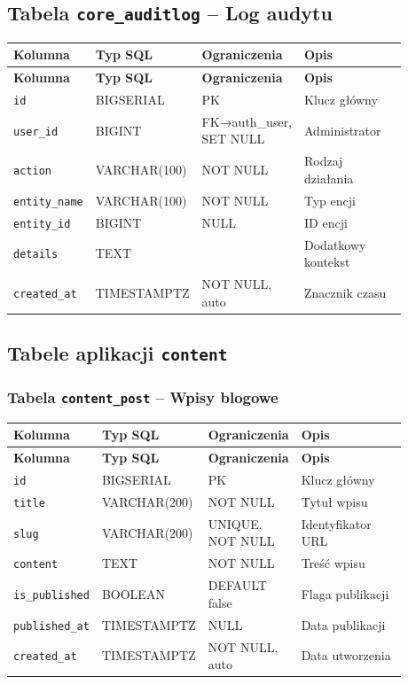\documentclass[12pt,a4paper]{article}
\begin{document}
\subsection{Tabela \texttt{core\_auditlog} -- Log audytu}

\begin{longtable}{p{0.2\linewidth}p{0.18\linewidth}p{0.18\linewidth}p{0.32\linewidth}}
\toprule
\textbf{Kolumna} & \textbf{Typ SQL} & \textbf{Ograniczenia} & \textbf{Opis} \\
\midrule
\endfirsthead
\toprule
\textbf{Kolumna} & \textbf{Typ SQL} & \textbf{Ograniczenia} & \textbf{Opis} \\
\midrule
\endhead
\texttt{id} & BIGSERIAL & PK & Klucz główny \\
\texttt{user\_id} & BIGINT & FK→auth\_user, SET NULL & Administrator \\
\texttt{action} & VARCHAR(100) & NOT NULL & Rodzaj działania \\
\texttt{entity\_name} & VARCHAR(100) & NOT NULL & Typ encji \\
\texttt{entity\_id} & BIGINT & NULL & ID encji \\
\texttt{details} & TEXT & & Dodatkowy kontekst \\
\texttt{created\_at} & TIMESTAMPTZ & NOT NULL, auto & Znacznik czasu \\
\bottomrule
\end{longtable}

\subsection{Tabele aplikacji \texttt{content}}

\subsubsection*{Tabela \texttt{content\_post} -- Wpisy blogowe}

\begin{longtable}{p{0.2\linewidth}p{0.18\linewidth}p{0.18\linewidth}p{0.32\linewidth}}
\toprule
\textbf{Kolumna} & \textbf{Typ SQL} & \textbf{Ograniczenia} & \textbf{Opis} \\
\midrule
\endfirsthead
\toprule
\textbf{Kolumna} & \textbf{Typ SQL} & \textbf{Ograniczenia} & \textbf{Opis} \\
\midrule
\endhead
\texttt{id} & BIGSERIAL & PK & Klucz główny \\
\texttt{title} & VARCHAR(200) & NOT NULL & Tytuł wpisu \\
\texttt{slug} & VARCHAR(200) & UNIQUE, NOT NULL & Identyfikator URL \\
\texttt{content} & TEXT & NOT NULL & Treść wpisu \\
\texttt{is\_published} & BOOLEAN & DEFAULT false & Flaga publikacji \\
\texttt{published\_at} & TIMESTAMPTZ & NULL & Data publikacji \\
\texttt{created\_at} & TIMESTAMPTZ & NOT NULL, auto & Data utworzenia \\
\bottomrule
\end{longtable}
\end{document}
